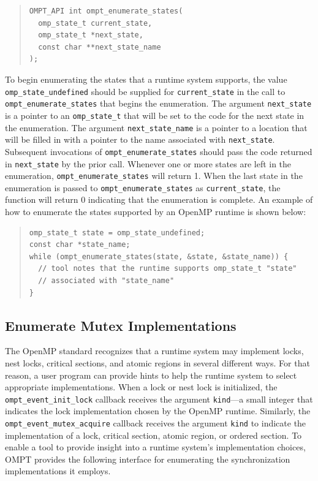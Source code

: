 \documentclass{article}
\begin{document}
\begin{quote}
\begin{verbatim}
OMPT_API int ompt_enumerate_states(
  omp_state_t current_state, 
  omp_state_t *next_state, 
  const char **next_state_name
);
\end{verbatim}
\end{quote}

\noindent
To begin enumerating the states that a runtime system supports,
the value \verb|omp_state_undefined| should be supplied for \verb|current_state| in the call to \verb|ompt_enumerate_states| that begins the enumeration.
The argument \verb|next_state| is a pointer to an \verb|omp_state_t| that will be set to the code for the next state in the enumeration.
The argument \verb|next_state_name| is a pointer to a location that will be filled in with a pointer to the name associated with \verb|next_state|. 
Subsequent invocations of \verb|ompt_enumerate_states| should pass the code returned in \verb|next_state| by the prior call.
Whenever one or more states are left in the enumeration, \verb|ompt_enumerate_states| will return 1.
When the last state in the enumeration is passed to \verb|ompt_enumerate_states| as \verb|current_state|, the function will return 0 indicating that the enumeration is complete.
An example of how to enumerate the states supported by an OpenMP runtime is shown below:

\begin{quote}
\begin{verbatim}
omp_state_t state = omp_state_undefined;
const char *state_name;
while (ompt_enumerate_states(state, &state, &state_name)) {
  // tool notes that the runtime supports omp_state_t "state" 
  // associated with "state_name" 
}
\end{verbatim}
\end{quote}

 \subsection{Enumerate Mutex Implementations}
 \label{ompt_enumerate_mutex_kinds}
 
The OpenMP standard recognizes that a runtime system may implement locks, nest locks, critical sections, and atomic regions in several different ways. For that reason, a user program can provide hints to help the runtime system to select appropriate implementations.
When a lock or nest lock is initialized, the \verb|ompt_event_init_lock| callback receives the argument \verb|kind|---a small integer that indicates the lock implementation chosen by the OpenMP runtime. Similarly,  the \verb|ompt_event_mutex_acquire| callback receives the argument \verb|kind| to indicate 
the implementation of a lock, critical section, atomic region, or ordered section. To enable a tool to provide insight into a runtime system's implementation choices, OMPT provides
the following interface for enumerating the synchronization implementations it employs.
\end{document}
